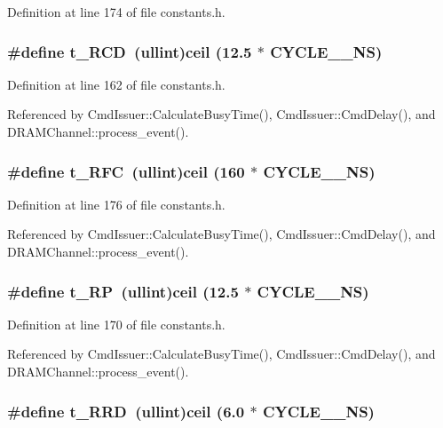 Definition at line 174 of file constants.h.
\subsubsection[{t\_\-RCD}]{\setlength{\rightskip}{0pt plus 5cm}\#define t\_\-RCD~({\bf ullint})ceil (12.5 $\ast$ CYCLE\_\_\-NS)}\label{constants_8h_a0b4c1284510d2df0ab953cd34c60184}




Definition at line 162 of file constants.h.

Referenced by CmdIssuer::CalculateBusyTime(), CmdIssuer::CmdDelay(), and DRAMChannel::process\_\-event().
\subsubsection[{t\_\-RFC}]{\setlength{\rightskip}{0pt plus 5cm}\#define t\_\-RFC~({\bf ullint})ceil (160 $\ast$ CYCLE\_\_\-NS)}\label{constants_8h_2950f4322cfae4dd9a1af1d6ec877da2}




Definition at line 176 of file constants.h.

Referenced by CmdIssuer::CalculateBusyTime(), CmdIssuer::CmdDelay(), and DRAMChannel::process\_\-event().
\subsubsection[{t\_\-RP}]{\setlength{\rightskip}{0pt plus 5cm}\#define t\_\-RP~({\bf ullint})ceil (12.5 $\ast$ CYCLE\_\_\-NS)}\label{constants_8h_3535fb1e2afd53a154572f38c021205e}




Definition at line 170 of file constants.h.

Referenced by CmdIssuer::CalculateBusyTime(), CmdIssuer::CmdDelay(), and DRAMChannel::process\_\-event().
\subsubsection[{t\_\-RRD}]{\setlength{\rightskip}{0pt plus 5cm}\#define t\_\-RRD~({\bf ullint})ceil (6.0 $\ast$ CYCLE\_\_\-NS)}\label{constants_8h_adb9eb810bb8613f1f3c2e12d7a3eea4}




